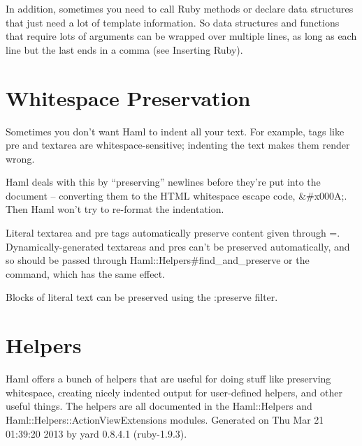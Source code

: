 \documentclass[9pt]{article}
\begin{document}
 In addition, sometimes you need to call Ruby methods or declare data structures that just need a lot of template information. So data structures and functions that require lots of arguments can be wrapped over multiple lines, as long as each line but the last ends in a comma (see Inserting Ruby).
\section{Whitespace Preservation}


 Sometimes you don’t want Haml to indent all your text. For example, tags like pre and textarea are whitespace-sensitive; indenting the text makes them render wrong.


 Haml deals with this by “preserving” newlines before they’re put into the document – converting them to the HTML whitespace escape code, \&\#x000A;. Then Haml won’t try to re-format the indentation.


 Literal textarea and pre tags automatically preserve content given through =. Dynamically-generated textareas and pres can’t be preserved automatically, and so should be passed through Haml::Helpers\#find\_and\_preserve or the ~ command, which has the same effect.


 Blocks of literal text can be preserved using the :preserve filter.
\section{Helpers}


 Haml offers a bunch of helpers that are useful for doing stuff like preserving whitespace, creating nicely indented output for user-defined helpers, and other useful things. The helpers are all documented in the Haml::Helpers and Haml::Helpers::ActionViewExtensions modules.
 Generated on Thu Mar 21 01:39:20 2013 by yard 0.8.4.1 (ruby-1.9.3). 
\end{document}
